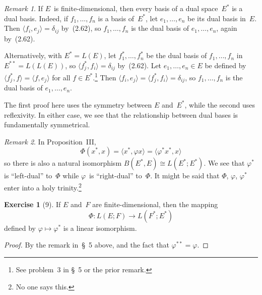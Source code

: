 \documentclass[letterpaper,12pt]{article}
\newcommand{\iso}{\cong}
\newcommand{\sprod}[2]{\langle#1,#2\rangle}
\theoremstyle{definition}
\newtheorem*{exer}{Exercise}
\theoremstyle{remark}
\newtheorem*{rmk}{Remark}
\begin{document}
\begin{rmk}
If \(E\)~is finite-dimensional, then every basis of a dual space~\(E^*\) is a dual basis. Indeed, if \(f_1,\ldots,f_n\) is a basis of~\(E^*\), let \(e_1,\ldots,e_n\) be its dual basis in~\(E\). Then \(\sprod{f_i}{e_j}=\delta_{ij}\) by~(2.62), so \(f_1,\ldots,f_n\) is the dual basis of \(e_1,\ldots,e_n\), again by~(2.62).

Alternatively, with \(E^*=L(E)\), let \(f_1^*,\ldots,f_n^*\) be the dual basis of \(f_1,\ldots,f_n\) in \(E^{**}=L(L(E))\), so \(\sprod{f_j^*}{f_i}=\delta_{ij}\) by~(2.62). Let \(e_1,\ldots,e_n\in E\) be defined by \(\sprod{f_j^*}{f}=\sprod{f}{e_j}\) for all \(f\in E^*\).\footnote{See problem~3 in \S~5 or the prior remark.} Then \(\sprod{f_i}{e_j}=\sprod{f_j^*}{f_i}=\delta_{ij}\), so \(f_1,\ldots,f_n\) is the dual basis of \(e_1,\ldots,e_n\).

The first proof here uses the symmetry between \(E\) and~\(E^*\), while the second uses reflexivity. In either case, we see that the relationship between dual bases is fundamentally symmetrical.
\end{rmk}

\begin{rmk}
In Proposition~III,
\[\Phi(x^*,x)=\sprod{x^*}{\varphi x}=\sprod{\varphi^* x^*}{x}\]
so there is also a natural isomorphism \(B(E^*,E)\iso L(E^*;E^*)\). We see that \(\varphi^*\) is ``left-dual'' to~\(\Phi\) while \(\varphi\)~is ``right-dual'' to~\(\Phi\). It might be said that \(\Phi\), \(\varphi\), \(\varphi^*\) enter into a holy trinity.\footnote{No one says this.}
\end{rmk}

\begin{exer}[9]
If \(E\) and~\(F\) are finite-dimensional, then the mapping
\[\Phi:L(E;F)\to L(F^*;E^*)\]
defined by \(\varphi\mapsto\varphi^*\) is a linear isomorphism.
\end{exer}
\begin{proof}
By the remark in~\S~5 above, and the fact that \(\varphi^{**}=\varphi\).
\end{proof}
\end{document}
